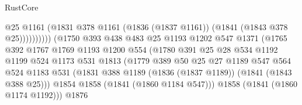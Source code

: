 \begin{lexlean}{RustCore}
\begin{coremodule}
                                              @25
                                              @1161
                                              (@1831
                                                @378
                                                @1161
                                                (@1836 (@1837 @1161))
                                                (@1841 (@1843 @378 @25))))))))))
                                (@1750
                                  @393
                                  @438
                                  @483
                                  @25
                                  @1193
                                  @1202
                                  @547
                                  @1371
                                  (@1765
                                    @392
                                    @1767
                                    @1769
                                    @1193
                                    @1200
                                    @554
                                    (@1780
                                      @391
                                      @25
                                      @28
                                      @534
                                      @1192
                                      @1199
                                      @524
                                      @1173
                                      @531
                                      @1813
                                      (@1779
                                        @389
                                        @50
                                        @25
                                        @27
                                        @1189
                                        @547
                                        @564
                                        @524
                                        @1183
                                        @531
                                        (@1831
                                          @388
                                          @1189
                                          (@1836 (@1837 @1189))
                                          (@1841 (@1843 @388 @25)))
                                        @1854
                                        @1858
                                        (@1841 (@1860 @1184 @547)))
                                      @1858
                                      (@1841 (@1860 @1174 @1192)))
                                    @1876

\end{coremodule}
\end{lexlean}
